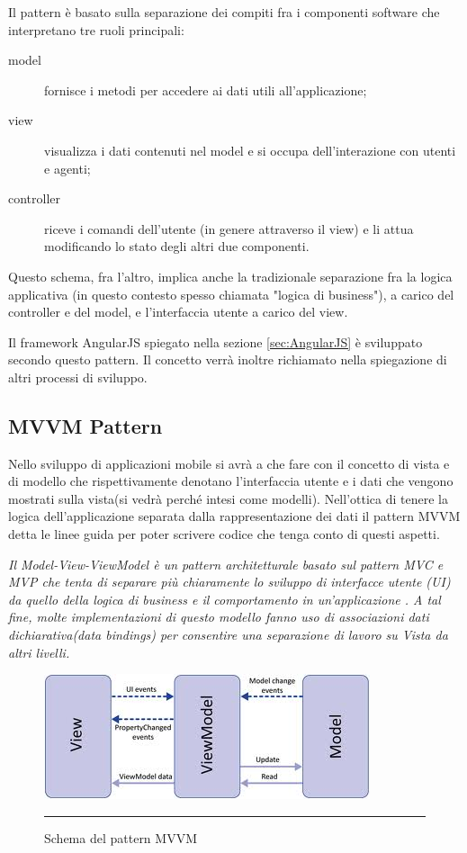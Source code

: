 Il pattern è basato sulla separazione dei compiti fra i componenti software che interpretano tre ruoli principali:
\begin{description}
\item[model] fornisce i metodi per accedere ai dati utili all'applicazione;
\item[view] visualizza i dati contenuti nel model e si occupa dell'interazione con utenti e agenti;
\item[controller] riceve i comandi dell'utente (in genere attraverso il view) e li attua modificando lo stato degli altri due componenti.
\end{description}
Questo schema, fra l'altro, implica anche la tradizionale separazione fra la logica applicativa (in questo contesto spesso chiamata "logica di business"), a carico del controller e del model, e l'interfaccia utente a carico del view.
\hspace*{\fill}\cite{wiki:mvc}

Il framework AngularJS spiegato nella sezione \ref{sec:AngularJS} è sviluppato secondo questo pattern. Il concetto verrà inoltre richiamato nella spiegazione di altri processi di sviluppo. 

\subsection{MVVM Pattern}

Nello sviluppo di applicazioni mobile si avrà a che fare con il concetto di vista e di modello che rispettivamente denotano l'interfaccia utente e i dati che vengono mostrati sulla vista(si vedrà perché intesi come modelli). Nell'ottica di tenere la logica dell'applicazione separata dalla rappresentazione dei dati il pattern MVVM detta le linee guida per poter scrivere codice che tenga conto di questi aspetti.

\emph{Il Model-View-ViewModel è un pattern architetturale basato sul pattern MVC e MVP che tenta di separare più chiaramente lo sviluppo di interfacce utente (UI) da quello della logica di business e il comportamento in un'applicazione . A tal fine, molte implementazioni di questo modello fanno uso di associazioni dati dichiarativa(data bindings) per consentire una separazione di lavoro su Vista da altri livelli.}
\hspace*{\fill}\cite{book:mvvm}

\begin{figure}[htbp]
  \centering
    \includegraphics[scale=0.75]{Figures/mvvm-1.jpeg}  
    \rule{35em}{0.5pt}
  \caption[MVVM Pattern]{Schema del pattern MVVM}
  \label{fig:MVVM Schema}
\end{figure}

